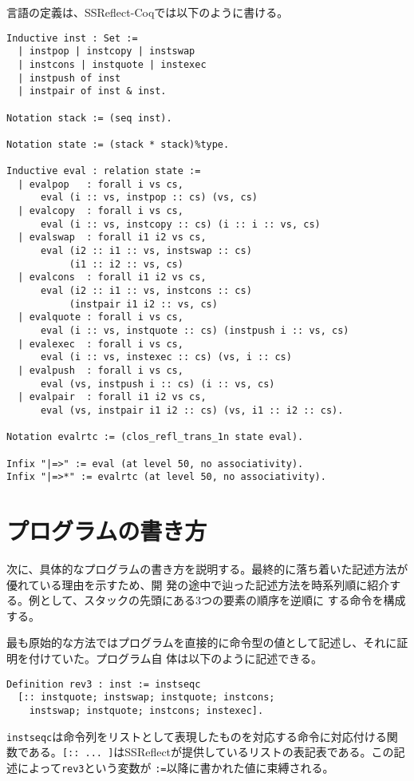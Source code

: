 \documentclass[a4paper, 10pt, twocolumn, titlepage]{ujarticle}
\renewcommand{\{}{\symbol{"7B}}
\renewcommand{\}}{\symbol{"7D}}
\begin{document}
言語の定義は、SSReflect-Coqでは以下のように書ける。

\begin{lstlisting}[style=plain]
Inductive inst : Set :=
  | instpop | instcopy | instswap
  | instcons | instquote | instexec
  | instpush of inst
  | instpair of inst & inst.

Notation stack := (seq inst).

Notation state := (stack * stack)%type.

Inductive eval : relation state :=
  | evalpop   : forall i vs cs,
      eval (i :: vs, instpop :: cs) (vs, cs)
  | evalcopy  : forall i vs cs,
      eval (i :: vs, instcopy :: cs) (i :: i :: vs, cs)
  | evalswap  : forall i1 i2 vs cs,
      eval (i2 :: i1 :: vs, instswap :: cs)
           (i1 :: i2 :: vs, cs)
  | evalcons  : forall i1 i2 vs cs,
      eval (i2 :: i1 :: vs, instcons :: cs)
           (instpair i1 i2 :: vs, cs)
  | evalquote : forall i vs cs,
      eval (i :: vs, instquote :: cs) (instpush i :: vs, cs)
  | evalexec  : forall i vs cs,
      eval (i :: vs, instexec :: cs) (vs, i :: cs)
  | evalpush  : forall i vs cs,
      eval (vs, instpush i :: cs) (i :: vs, cs)
  | evalpair  : forall i1 i2 vs cs,
      eval (vs, instpair i1 i2 :: cs) (vs, i1 :: i2 :: cs).

Notation evalrtc := (clos_refl_trans_1n state eval).

Infix "|=>" := eval (at level 50, no associativity).
Infix "|=>*" := evalrtc (at level 50, no associativity).
\end{lstlisting}

\section{プログラムの書き方}

次に、具体的なプログラムの書き方を説明する。最終的に落ち着いた記述方法が優れている理由を示すため、開
発の途中で辿った記述方法を時系列順に紹介する。例として、スタックの先頭にある3つの要素の順序を逆順に
する命令を構成する。

最も原始的な方法ではプログラムを直接的に命令型の値として記述し、それに証明を付けていた。プログラム自
体は以下のように記述できる。

\begin{lstlisting}[style=plain]
Definition rev3 : inst := instseqc
  [:: instquote; instswap; instquote; instcons;
    instswap; instquote; instcons; instexec].
\end{lstlisting}

\texttt{instseqc}は命令列をリストとして表現したものを対応する命令に対応付ける関数である。\texttt{[::
... ]}はSSReflectが提供しているリストの表記表である。この記述によって\texttt{rev3}という変数が
\texttt{:=}以降に書かれた値に束縛される。
\end{document}
